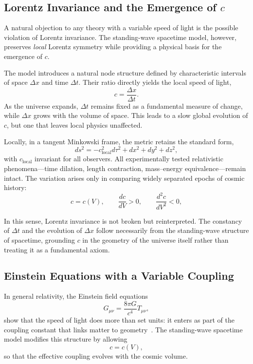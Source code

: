 \documentclass[12pt]{article}
\begin{document}
\subsection{Lorentz Invariance and the Emergence of $c$}

A natural objection to any theory with a variable speed of light is the possible violation of Lorentz invariance. The standing-wave spacetime model, however, preserves \emph{local} Lorentz symmetry while providing a physical basis for the emergence of $c$.

The model introduces a natural node structure defined by characteristic intervals of space $\Delta x$ and time $\Delta t$. Their ratio directly yields the local speed of light,
\begin{equation}
c = \frac{\Delta x}{\Delta t}.
\end{equation}
As the universe expands, $\Delta t$ remains fixed as a fundamental measure of change, while $\Delta x$ grows with the volume of space. This leads to a slow global evolution of $c$, but one that leaves local physics unaffected.

Locally, in a tangent Minkowski frame, the metric retains the standard form,
\begin{equation}
ds^2 = -c_{\text{local}}^2 d\tau^2 + dx^2 + dy^2 + dz^2,
\end{equation}
with $c_{\text{local}}$ invariant for all observers. All experimentally tested relativistic phenomena---time dilation, length contraction, mass–energy equivalence---remain intact. The variation arises only in comparing widely separated epochs of cosmic history:
\begin{equation}
  c = c(V), \qquad \frac{dc}{dV} > 0, \qquad \frac{d^2c}{dV^2} < 0,
\end{equation}

In this sense, Lorentz invariance is not broken but reinterpreted. The constancy of $\Delta t$ and the evolution of $\Delta x$ follow necessarily from the standing-wave structure of spacetime, grounding $c$ in the geometry of the universe itself rather than treating it as a fundamental axiom.

\subsection{Einstein Equations with a Variable Coupling}

In general relativity, the Einstein field equations~\cite{misner1973}  
\begin{equation}
  G_{\mu\nu} = \frac{8\pi G}{c^4} T_{\mu\nu},
\end{equation}
show that the speed of light does more than set units: it enters as part of the coupling constant that links matter to geometry~\cite{albrecht1999}. The standing-wave spacetime model modifies this structure by allowing
\begin{equation}
  c = c(V),
\end{equation}
so that the effective coupling evolves with the cosmic volume.
\end{document}
